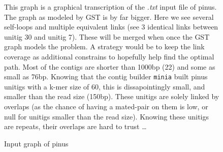 \documentclass[12pt]{article}
\begin{document}
\begin{figure}[h!]
\caption{Input graph of pinus}
\footnotesize This graph is a graphical transcription of the \textit{.txt} input file of pinus. The graph as modeled by GST is by far bigger. Here we see several self-loops and multiple equivalent links (see 3 identical links between unitig 30 and unitig 7). These will be merged when once the GST graph models the problem. A strategy would be to keep the link coverage as additional constrains to hopefully help find the optimal path. Most of the contigs are shorter than 1000bp (22) and some as small as 76bp. Knowing that the contig builder \texttt{minia} built pinus unitigs with a k-mer size of 60, this is dissapointingly small, and smaller than the read size (150bp). These unitigs are solely linked by overlaps (as the chance of having a mated-pair on them is low, or null for unitigs smaller than the read size). Knowing these unitigs are repeats, their overlaps are hard to trust \ldots
\label{fig:graphpinus}
\begin{center}
\end{center}
\end{figure}
\end{document}
